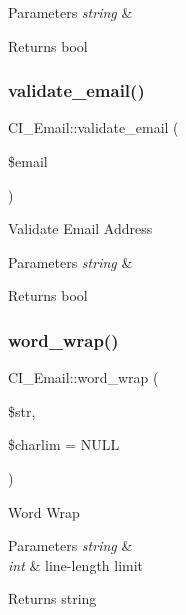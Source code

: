 \begin{DoxyParams}{Parameters}
{\em string} & \\
\hline
\end{DoxyParams}
\begin{DoxyReturn}{Returns}
bool 
\end{DoxyReturn}
\mbox{\label{class_c_i___email_a48cc8afa8d64719dc0fc3bd9d5a90478}} 
\subsubsection{\texorpdfstring{validate\+\_\+email()}{validate\_email()}}
{\footnotesize\ttfamily C\+I\+\_\+\+Email\+::validate\+\_\+email (\begin{DoxyParamCaption}\item[{}]{\$email }\end{DoxyParamCaption})}

Validate Email Address


\begin{DoxyParams}{Parameters}
{\em string} & \\
\hline
\end{DoxyParams}
\begin{DoxyReturn}{Returns}
bool 
\end{DoxyReturn}
\mbox{\label{class_c_i___email_a71c58d5d3015802c544fcdea46c19e1e}} 
\subsubsection{\texorpdfstring{word\+\_\+wrap()}{word\_wrap()}}
{\footnotesize\ttfamily C\+I\+\_\+\+Email\+::word\+\_\+wrap (\begin{DoxyParamCaption}\item[{}]{\$str,  }\item[{}]{\$charlim = {\ttfamily NULL} }\end{DoxyParamCaption})}

Word Wrap


\begin{DoxyParams}{Parameters}
{\em string} & \\
\hline
{\em int} & line-\/length limit \\
\hline
\end{DoxyParams}
\begin{DoxyReturn}{Returns}
string 
\end{DoxyReturn}


